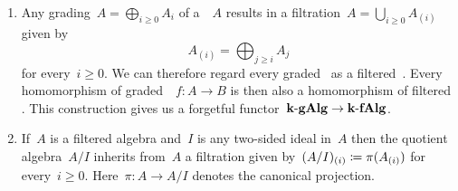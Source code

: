 \begin{remark}
  \leavevmode
  \begin{enumerate}
    \item
      Any grading~$A = \bigoplus_{i \geq 0} A_i$ of a~{\algebra{$\kf$}}~$A$ results in a filtration~$A = \bigcup_{i \geq 0} A_{(i)}$ given by
      \[
        A_{(i)}
        =
        \bigoplus_{j \geq i} A_j
      \]
      for every~$i \geq 0$.
      We can therefore regard every graded~{\algebra{$\kf$}} as a filtered~{\algebra{$\kf$}}.
      Every homomorphism of graded~{\algebras{$\kf$}}~$f \colon A \to B$ is then also a homomorphism of filtered \algebras{$\kf$}.
      This construction gives us a forgetful functor~$\mathbf{k}\text{-}\mathbf{gAlg} \to \mathbf{k}\text{-}\mathbf{fAlg}$.
    \item 
      If~$A$ is a filtered algebra and~$I$ is any two-sided ideal in~$A$ then the quotient algebra~$A/I$ inherits from~$A$ a filtration given by~$(A/I)_{(i)} \coloneqq \pi(A_{(i)})$ for every~$i \geq 0$.
      Here~$\pi \colon A \to A/I$ denotes the canonical projection.
  \end{enumerate}
\end{remark}


